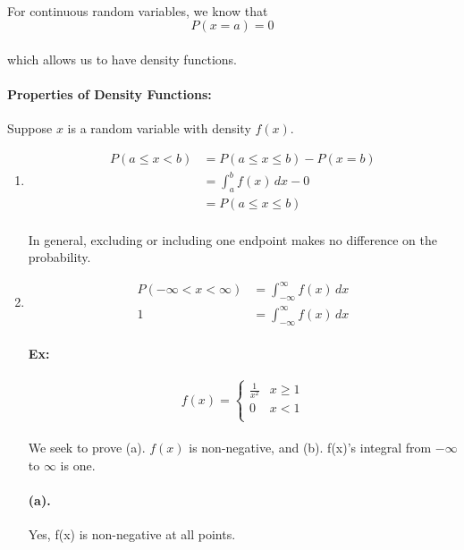 \documentclass{article}
\begin{document}
\paragraph{}For continuous random variables, we know that 
\[
  P(x = a) = 0 
\]
\paragraph{}which allows us to have density functions.

\paragraph{Properties of Density Functions:}Suppose $x$ is a random variable with density $f(x)$.
\begin{enumerate}
    \item
    \begin{align*}
        P(a\le x < b) &= P(a \le x \le b) - P(x = b)\\
                      &= \int_a^b f(x)\,dx - 0 \\
                      &= P(a \le x \le b)
    \end{align*}
    \paragraph{}In general, excluding or including one endpoint makes no difference on the probability.
    \item 
        \begin{align*}
            P(-\infty < x < \infty) &= \int_{-\infty}^{\infty} f(x) \,dx\\
            1 &= \int_{-\infty}^{\infty} f(x) \,dx
        \end{align*}
        \paragraph{Ex:}
        \[ f(x) = \begin{cases}
            \frac{1}{x^2} & x \ge 1 \\
            0 & x < 1 \\
            \end{cases}
        \]
        \paragraph{}We seek to prove (a). $f(x)$ is non-negative, and (b). f(x)'s integral from
        $-\infty$ to $\infty$ is one.
        \paragraph{(a).} Yes, f(x) is non-negative at all points.

\end{enumerate}
\end{document}
